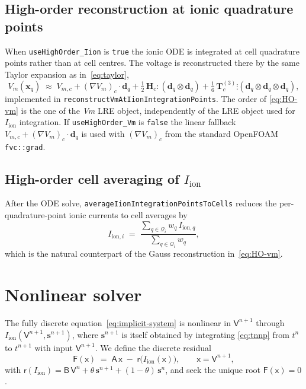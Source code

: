 \documentclass[11pt,a4paper]{article}
\newcommand{\Vm}{V_{m}}
\newcommand{\Vmsub}[1]{V_{m,#1}}
\newcommand{\Iion}{I_{\text{ion}}}
\newcommand{\Iionsub}[1]{I_{\text{ion},#1}}
\newcommand{\grad}{\nabla}
\newcommand{\Aimp}{\mathsf{A}}
\newcommand{\Bimp}{\mathsf{B}}
\newcommand{\code}[1]{\texttt{\small #1}}
\begin{document}
\subsection{High-order reconstruction at ionic quadrature points}

When \code{useHighOrder\_Iion} is \code{true} the ionic ODE is
integrated at cell quadrature points rather than at cell centres. The
voltage is reconstructed there by the same Taylor expansion as
in~\eqref{eq:taylor},
\begin{equation}
  \Vm(\mathbf{x}_{q})
   \;\approx\;
   \Vmsub{c} + (\grad \Vm)_{c} \cdot \mathbf{d}_{q}
   + \tfrac{1}{2}\, \mathbf{H}_{c} \!:\! (\mathbf{d}_{q} \otimes \mathbf{d}_{q})
   + \tfrac{1}{6}\, \mathbf{T}^{(3)}_{c} \!\vdots\!
       (\mathbf{d}_{q} \otimes \mathbf{d}_{q} \otimes \mathbf{d}_{q}),
   \label{eq:HO-vm}
\end{equation}
implemented in \code{reconstructVmAtIionIntegrationPoints}. The order
of \eqref{eq:HO-vm} is the one of the \emph{Vm} LRE object,
independently of the LRE object used for $\Iion$ integration. If
\code{useHighOrder\_Vm} is \code{false} the linear fallback
$\Vmsub{c} + (\grad\Vm)_{c}\!\cdot\! \mathbf{d}_{q}$ is used with
$(\grad\Vm)_{c}$ from the standard OpenFOAM \code{fvc::grad}.

\subsection{High-order cell averaging of $\Iion$}

After the ODE solve, \code{averageIionIntegrationPointsToCells}
reduces the per-quadrature-point ionic currents to cell averages by
\begin{equation}
  \Iionsub{i} \;=\; \frac{\sum_{q \in \mathcal{Q}_{i}} w_{q}\, \Iionsub{q}}
                       {\sum_{q \in \mathcal{Q}_{i}} w_{q}},
\end{equation}
which is the natural counterpart of the Gauss reconstruction
in~\eqref{eq:HO-vm}.

\section{Nonlinear solver}

The fully discrete equation~\eqref{eq:implicit-system} is nonlinear in
$\mathsf{V}^{n+1}$ through $\Iion(\mathsf{V}^{n+1}, \mathbf{s}^{n+1})$,
where $\mathbf{s}^{n+1}$ is itself obtained by integrating
\eqref{eq:tnnp} from $t^{n}$ to $t^{n+1}$ with input
$\mathsf{V}^{n+1}$. We define the discrete residual
\begin{equation}
  \mathsf{F}(\mathsf{x})
   \;=\;
   \Aimp\, \mathsf{x}
   \;-\;
   \mathsf{r}\!\bigl( \Iion(\mathsf{x}) \bigr),
   \qquad
   \mathsf{x} = \mathsf{V}^{n+1},
   \label{eq:Fdef}
\end{equation}
with $\mathsf{r}(\Iion) = \Bimp\, \mathsf{V}^{n} +
\theta\, \mathbf{s}^{n+1} + (1-\theta)\, \mathbf{s}^{n}$, and seek the
unique root $\mathsf{F}(\mathsf{x}) = 0$.
\end{document}
